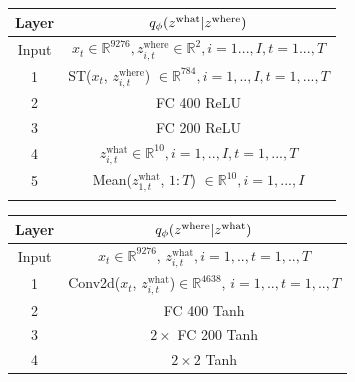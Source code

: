 \documentclass[anonymous=false, %
               format=acmsmall, %
               review=true, %
               screen=true, %
               nonacm=true]{acmart}
\theoremstyle{definition}
\begin{document}
\begin{table}[h]
\centering
\begin{tabular}{c|c}
    \toprule
    \textbf{Layer} & $q_\phi(z^{\mathrm{what}} | z^{\mathrm{where}})$ \\
    \midrule
    Input & $x_t\in\mathbb{R}^{9276}, z^{\mathrm{where}}_{i, t}\in\mathbb{R}^{2}, i=1...,I, t=1...,T$
    \\
    \hline
    1 & 
    ST($x_t$, $z^{\mathrm{where}} _{i, t}$) $\in\mathbb{R}^{784}, i=1,..,I, t=1,...,T$  \\
    \hline
    2 &
    FC 400 ReLU \\
    \hline
    3 &
    FC 200 ReLU \\
    \hline
    4 & $z^{\mathrm{what}}_{i, t} \in\mathbb{R}^{10}, i=1,..,I, t=1,...,T$  \\
    \hline
    5 &
    Mean($z^{\mathrm{what}}_{1, t}$, $1:T$) $\in\mathbb{R}^{10}, i=1,...,I$\\
    \bottomrule
    \label{arch-bmnist-enc-what}
\end{tabular}
\end{table}

\begin{table}[h]
    \centering
    \begin{tabular}{c|c}
     \toprule
    \textbf{Layer} & $q_\phi(z^{\mathrm{where}} | z^{\mathrm{what}})$ \\
    \midrule
    Input &
    $x_t\in\mathbb{R}^{9276}$, $z^{\mathrm{what}}_{i, t}, i=1,.., t=1,..,T$ \\
    \hline
    1 & 
    Conv2d($x_t$, $z^{\mathrm{what}}_{i, t}$)$\in\mathbb{R}^{4638}$, $i=1,.., t=1,..,T$ \\
    \hline
    2  &
    FC 400 Tanh \\
    \hline
    3 & $2\times$ FC 200 Tanh \\
    \hline
    4 &
    $2\times2$ Tanh 
    \\
    \bottomrule
    \end{tabular}
    \label{arch-bmnist-enc-where}
\end{table}
\end{document}
